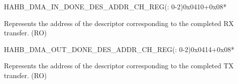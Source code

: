 {    \begin{register}{H}{AHB\_DMA\_IN\_DONE\_DES\_ADDR\_CH\_REG(: 0-2)}{0x0410+0x08*}\label{regdesc:AHBDMAINDONEDESADDRCHNREG}
    \regnewline%
    \begin{regdesc}\begin{reglist}
    \label{fielddesc:AHBDMAINDONEDESADDRCHN}\item [AHB\_DMA\_IN\_DONE\_DES\_ADDR\_CH\regindex{n}] Represents the address of the descriptor corresponding to the completed RX transfer. (RO)
    \end{reglist}\end{regdesc}
    \end{register}


    \begin{register}{H}{AHB\_DMA\_OUT\_DONE\_DES\_ADDR\_CH\_REG(: 0-2)}{0x0414+0x08*}\label{regdesc:AHBDMAOUTDONEDESADDRCHNREG}
    \regnewline%
    \begin{regdesc}\begin{reglist}
    \label{fielddesc:AHBDMAOUTDONEDESADDRCHN}\item [AHB\_DMA\_OUT\_DONE\_DES\_ADDR\_CH\regindex{n}] Represents the address of the descriptor corresponding to the completed TX transfer. (RO)
    \end{reglist}\end{regdesc}
    \end{register}
}
